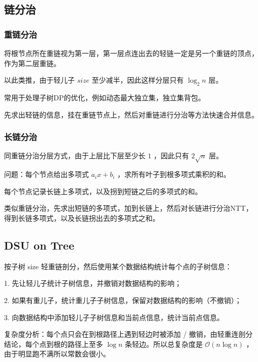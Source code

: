 

\subsection{链分治}

\subsubsection{重链分治}

将根节点所在重链视为第一层，第一层点连出去的轻链一定是另一个重链的顶点，作为第二层重链。

以此类推，由于轻儿子 $size$ 至少减半，因此这样分层只有 $\log_2n$ 层。

常用于处理子树DP的优化，例如动态最大独立集，独立集背包。

先求出轻链的信息，挂在重链节点上，然后对重链进行分治等方法快速合并信息。



\subsubsection{长链分治}

同重链分治分层方式，由于上层比下层至少长 $1$ ，因此只有 $2\sqrt n$ 层。

问题：每个节点给出多项式 $a_ix+b_i$ ，求所有叶子到根多项式乘积的和。

每个节点记录长链上多项式，以及拐到短链之后的多项式的和。

类似重链分治，先求出短链的多项式，加到长链上，然后对长链进行分治NTT，得到长链多项式，以及长链拐出去的多项式之和。

\newpage

\subsection{DSU on Tree}

按子树 size 轻重链剖分，然后使用某个数据结构统计每个点的子树信息：

1. 先让轻儿子统计子树信息，并撤销对数据结构的影响；

2. 如果有重儿子，统计重儿子子树信息，保留对数据结构的影响（不撤销）；

3. 向数据结构中添加轻儿子子树信息和当前点信息，统计当前点信息。

\vspace{0.2cm}

复杂度分析：每个点只会在到根路径上遇到轻边时被添加 / 撤销，由轻重连剖分结论，每个点到根的路径上至多 $\log n$ 条轻边。所以总复杂度是  $\mathcal O(n \log n )$ ，由于明显跑不满所以常数会很小。

